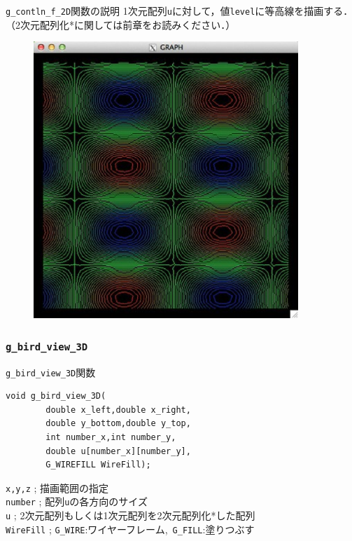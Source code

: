 \documentclass[a4paper,12pt]{jsarticle}%
\begin{document}
\begin{itembox}[l]{\texttt{g\_contln\_f\_2D}関数の説明}
1次元配列\verb|u|に対して，値\verb|level|に等高線を描画する．（2次元配列化*に関しては前章をお読みください．）
\end{itembox}

\begin{figure}[htb]
	\includegraphics[width=100mm]{./Figures/eps/Canvas_g_contln.eps}
\end{figure}




\clearpage
\subsubsection{\texttt{g\_bird\_view\_3D}}

\begin{itembox}[l]{\texttt{g\_bird\_view\_3D}関数}
\begin{verbatim}
void g_bird_view_3D(
        double x_left,double x_right, 
        double y_bottom,double y_top,
        int number_x,int number_y,
        double u[number_x][number_y],
        G_WIREFILL WireFill);
\end{verbatim}
\verb|x,y,z| ; 描画範囲の指定\\
\verb|number| ; 配列\verb|u|の各方向のサイズ\\
\verb|u| ; 2次元配列もしくは1次元配列を2次元配列化*した配列\\
\verb|WireFill| ; \verb|G_WIRE|:ワイヤーフレーム,\ \verb|G_FILL|:塗りつぶす \\
\end{itembox}
\end{document}
